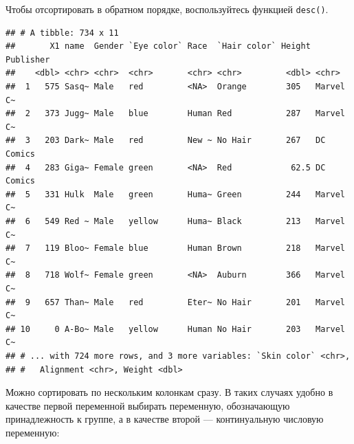 \documentclass[]{book}
\newenvironment{Shaded}{\begin{snugshade}}{\end{snugshade}}
\newcommand{\KeywordTok}[1]{\textcolor[rgb]{0.13,0.29,0.53}{\textbf{#1}}}
\newcommand{\StringTok}[1]{\textcolor[rgb]{0.31,0.60,0.02}{#1}}
\newcommand{\OperatorTok}[1]{\textcolor[rgb]{0.81,0.36,0.00}{\textbf{#1}}}
\newcommand{\NormalTok}[1]{#1}
\begin{document}
Чтобы отсортировать в обратном порядке, воспользуйтесь функцией
\texttt{desc()}.

\begin{Shaded}
\end{Shaded}

\begin{verbatim}
## # A tibble: 734 x 11
##       X1 name  Gender `Eye color` Race  `Hair color` Height Publisher
##    <dbl> <chr> <chr>  <chr>       <chr> <chr>         <dbl> <chr>    
##  1   575 Sasq~ Male   red         <NA>  Orange        305   Marvel C~
##  2   373 Jugg~ Male   blue        Human Red           287   Marvel C~
##  3   203 Dark~ Male   red         New ~ No Hair       267   DC Comics
##  4   283 Giga~ Female green       <NA>  Red            62.5 DC Comics
##  5   331 Hulk  Male   green       Huma~ Green         244   Marvel C~
##  6   549 Red ~ Male   yellow      Huma~ Black         213   Marvel C~
##  7   119 Bloo~ Female blue        Human Brown         218   Marvel C~
##  8   718 Wolf~ Female green       <NA>  Auburn        366   Marvel C~
##  9   657 Than~ Male   red         Eter~ No Hair       201   Marvel C~
## 10     0 A-Bo~ Male   yellow      Human No Hair       203   Marvel C~
## # ... with 724 more rows, and 3 more variables: `Skin color` <chr>,
## #   Alignment <chr>, Weight <dbl>
\end{verbatim}

Можно сортировать по нескольким колонкам сразу. В таких случаях удобно в
качестве первой переменной выбирать переменную, обозначающую
принадлежность к группе, а в качестве второй --- континуальную числовую
переменную:

\begin{Shaded}
\end{Shaded}
\end{document}
